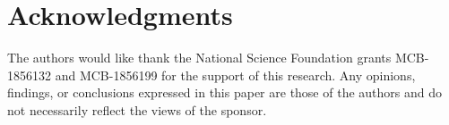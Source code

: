 \documentclass[10pt,letterpaper]{article}
\begin{document}
\section*{Acknowledgments}
The authors would like thank the National Science Foundation grants MCB-1856132 and MCB-1856199 for the support of this research. Any opinions, findings, or conclusions expressed in this paper are those of the authors and do not necessarily reflect the views of the sponsor.

\nolinenumbers

%
%
% 
\end{document}
